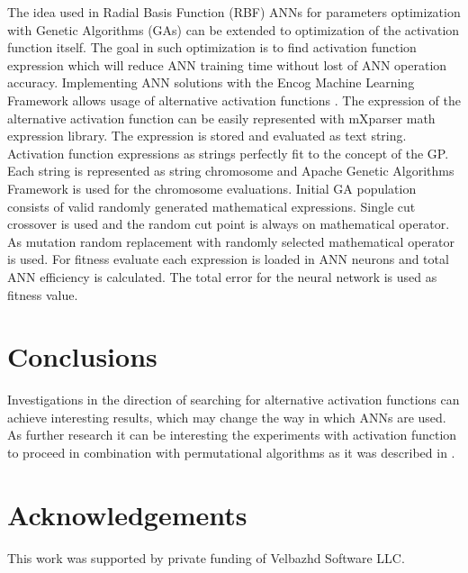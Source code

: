 \documentclass{llncs}
\begin{document}
The idea used in Radial Basis Function (RBF) ANNs for parameters optimization with Genetic Algorithms (GAs) \cite{awad01} can be extended to optimization of the activation function itself. The goal in such optimization is to find activation function expression which will reduce ANN training time without lost of ANN operation accuracy. Implementing ANN solutions with the Encog Machine Learning Framework allows usage of alternative activation functions \cite{zankinski01}. The expression of the alternative activation function can be easily represented with mXparser math expression library. The expression is stored and evaluated as text string. Activation function expressions as strings perfectly fit to the concept of the GP. Each string is represented as string chromosome and Apache Genetic Algorithms Framework is used for the chromosome evaluations. Initial GA population consists of valid randomly generated mathematical expressions. Single cut crossover is used and the random cut point is always on mathematical operator. As mutation random replacement with randomly selected mathematical operator is used. For fitness evaluate each expression is loaded in ANN neurons and total ANN efficiency is calculated. The total error for the neural network is used as fitness value. 

\section{Conclusions}

Investigations in the direction of searching for alternative activation functions can achieve interesting results, which may change the way in which ANNs are used. As further research it can be interesting the experiments with activation function to proceed in combination with permutational algorithms as it was described in \cite{zankinski02}.


\section*{Acknowledgements}

This work was supported by private funding of Velbazhd Software LLC.

\end{document}

